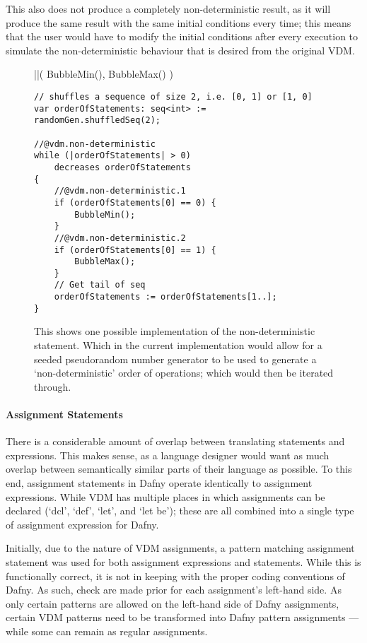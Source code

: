 \documentclass{entcs}
\begin{document}
This also does not produce a completely non-deterministic result, as it will produce the same result with the same initial conditions every time; this means that the user would have to modify the initial conditions after every execution to simulate the non-deterministic behaviour that is desired from the original VDM.

\begin{figure}[h]
	\begin{center}
        \begin{vdmsl}
||(
    BubbleMin(),
    BubbleMax()
)
        \end{vdmsl}
        \begin{lstlisting}[language=Dafny]
// shuffles a sequence of size 2, i.e. [0, 1] or [1, 0]
var orderOfStatements: seq<int> := randomGen.shuffledSeq(2);

//@vdm.non-deterministic
while (|orderOfStatements| > 0) 
    decreases orderOfStatements
{
    //@vdm.non-deterministic.1
    if (orderOfStatements[0] == 0) {
        BubbleMin();
    }
    //@vdm.non-deterministic.2
    if (orderOfStatements[0] == 1) {
        BubbleMax();
    }
    // Get tail of seq 
    orderOfStatements := orderOfStatements[1..];
}
        \end{lstlisting}
		\caption{This shows one possible implementation of the non-deterministic statement. Which in the current implementation would allow for a seeded pseudorandom number generator to be used to generate a `non-deterministic' order of operations; which would then be iterated through.}\label{fig:non-determinism}
	\end{center}
\end{figure}

\paragraph{Assignment Statements}

There is a considerable amount of overlap between translating statements and expressions. This makes sense, as a language designer would want as much overlap between semantically similar parts of their language as possible. To this end, assignment statements in Dafny operate identically to assignment expressions. While VDM has multiple places in which assignments can be declared (`dcl', `def', `let', and `let be'); these are all combined into a single type of assignment expression for Dafny. 

Initially, due to the nature of VDM assignments, a pattern matching assignment statement was used for both assignment expressions and statements. While this is functionally correct, it is not in keeping with the proper coding conventions of Dafny. As such, check are made prior for each assignment's left-hand side. As only certain patterns are allowed on the left-hand side of Dafny assignments, certain VDM patterns need to be transformed into Dafny pattern assignments --- while some can remain as regular assignments.
\end{document}

